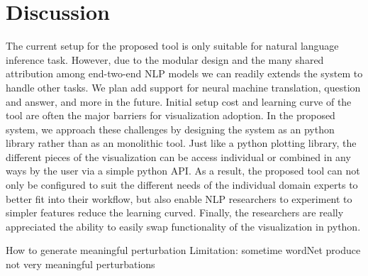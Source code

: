 \section{Discussion}

The current setup for the proposed tool is only suitable for natural language inference task. However, due to the modular design and the many shared attribution among end-two-end NLP models we can readily extends the system to handle other tasks. We plan add support for neural machine translation, question and answer, and more in the future.
%
Initial setup cost and learning curve of the tool are often the major barriers for visualization adoption.
In the proposed system, we approach these challenges by designing the system as an python library rather than as an monolithic tool. 
Just like a python plotting library, the different pieces of the visualization can be access individual or combined in any ways by the user via a simple python API.
As a result, the proposed tool can not only be configured to suit the different needs of the individual domain experts to better fit into their workflow, but also enable NLP researchers to experiment to simpler features reduce the learning curved. 
Finally, the researchers are really appreciated the ability to easily swap functionality of the visualization in python.

How to generate meaningful perturbation
Limitation: sometime wordNet produce not very meaningful  perturbations

